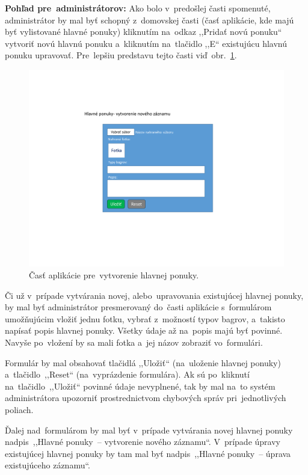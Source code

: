 \textbf{Pohľad pre~administrátorov:} Ako bolo v~predošlej časti spomenuté, administrátor by mal byť schopný z~domovskej časti (časť aplikácie, kde majú byť vylistované hlavné ponuky) kliknutím na~odkaz ,,Pridať novú ponuku`` vytvoriť novú hlavnú ponuku a~kliknutím na~tlačidlo ,,E`` existujúcu hlavnú ponuku upravovať. Pre~lepšiu predstavu tejto časti viď~obr.~\ref{main offer form}.

\begin{figure}[H]\centering
\includegraphics[width=140mm]{../img/UI concept/main offer form}
\caption{Časť aplikácie pre~vytvorenie hlavnej ponuky.}
\label{main offer form}
\end{figure}

Či už v~prípade vytvárania novej, alebo~upravovania existujúcej hlavnej ponuky, by mal byť administrátor presmerovaný do~časti aplikácie s~formulárom umožňujúcim vložiť jednu fotku, vybrať z~možností typov bagrov, a~takisto napísať popis hlavnej ponuky. Všetky údaje až na~popis majú byť povinné. Navyše po~vložení by sa mali fotka a~jej názov zobraziť vo~formulári.

Formulár by mal obsahovať tlačidlá ,,Uložiť`` (na~uloženie hlavnej ponuky) a~tlačidlo~,,Reset`` (na~vyprázdenie formulára). Ak sú po~kliknutí na~tlačidlo~,,Uložiť`` povinné údaje nevyplnené, tak by mal na~to systém administrátora upozorniť prostrednictvom chybových správ pri~jednotlivých poliach.

Ďalej nad~formulárom by mal byť v~prípade vytvárania novej hlavnej ponuky nadpis~,,Hlavné ponuky~-- vytvorenie nového záznamu``. V~prípade úpravy existujúcej hlavnej ponuky by tam mal byť nadpis~,,Hlavné ponuky~-- úprava existujúceho záznamu``.

